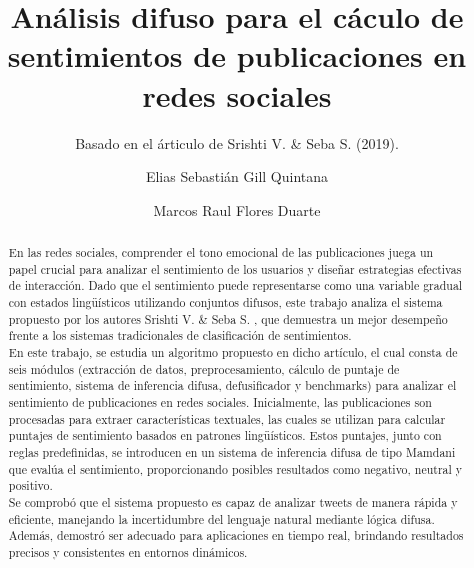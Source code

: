 \documentclass[sigconf, review=false, nonacm]{acmart}
\begin{document}
\title{Análisis difuso para el cáculo de sentimientos de publicaciones en redes sociales} \subtitle{Basado en
	el árticulo de Srishti V. \& Seba S. (2019).}

\author{Elias Sebastián Gill Quintana}

\author{Marcos Raul Flores Duarte}


\begin{abstract}
	En las redes sociales, comprender el tono emocional de las publicaciones juega un papel crucial para
	analizar el sentimiento de los usuarios y diseñar estrategias efectivas de interacción. Dado que el
	sentimiento puede representarse como una variable gradual con estados lingüísticos utilizando conjuntos
	difusos, este trabajo analiza el sistema propuesto por los autores Srishti V. \& Seba S. \cite{paper}, que
	demuestra un mejor desempeño frente a los sistemas tradicionales de clasificación de sentimientos.\\

	En este trabajo, se estudia un algoritmo propuesto en dicho artículo, el cual consta de seis módulos
	(extracción de datos, preprocesamiento, cálculo de puntaje de sentimiento, sistema de inferencia difusa,
	defusificador y benchmarks) para analizar el sentimiento de publicaciones en redes sociales. Inicialmente, las
	publicaciones son procesadas para extraer características textuales, las cuales se utilizan para calcular
	puntajes de sentimiento basados en patrones lingüísticos. Estos puntajes, junto con reglas predefinidas,
	se introducen en un sistema de inferencia difusa de tipo Mamdani que evalúa el sentimiento, proporcionando
	posibles resultados como negativo, neutral y positivo.\\

	Se comprobó que el sistema propuesto es capaz de analizar tweets de manera rápida y eficiente, manejando
	la incertidumbre del lenguaje natural mediante lógica difusa. Además, demostró ser adecuado para
	aplicaciones en tiempo real, brindando resultados precisos y consistentes en entornos dinámicos.
\end{abstract}
\end{document}
